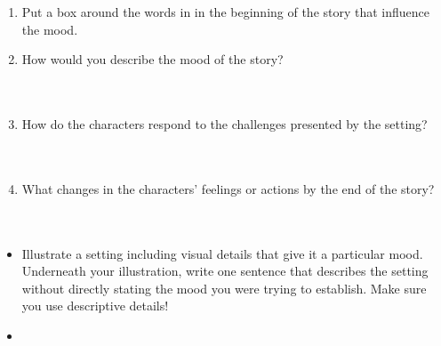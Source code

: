\documentclass[12pt]{article}
\begin{document}
\vspace{1em}

\begin{tcolorbox}[colframe=black!60, colback=white, 
coltitle=black, colbacktitle=black!15, fonttitle=\bfseries\Large, 
title=Independent Practice, halign title=center, left=10pt, right=10pt, top=10pt, bottom=15pt]

\begin{enumerate}[itemsep=1em]
    \item Put a box around the words in in the beginning of the story that influence the mood.

    \item How would you describe the mood of the story?
   \\[0.8cm] \underline{\hspace{14cm}}  
    \\[0.8cm] \underline{\hspace{14cm}}  
    \\[0.8cm] \underline{\hspace{14cm}} 
    \item How do the characters respond to the challenges presented by the setting?
\\[0.8cm] \underline{\hspace{14cm}}  
    \\[0.8cm] \underline{\hspace{14cm}}  
    \\[0.8cm] \underline{\hspace{14cm}} 
    \item What changes in the characters’ feelings or actions by the end of the story? 
    \\[0.8cm] \underline{\hspace{14cm}}  
    \\[0.8cm] \underline{\hspace{14cm}}  
    \\[0.8cm] \underline{\hspace{14cm}} 
\end{enumerate}
\end{tcolorbox}

\begin{tcolorbox}[colframe=black!60, colback=white, 
coltitle=black, colbacktitle=black!15, fonttitle=\bfseries\Large, 
title=Exit Ticket, halign title=center, left=10pt, right=10pt, top=10pt, bottom=15pt]
\begin{itemize}
    \item Illustrate a setting including visual details that give it a particular mood. Underneath your illustration, write one sentence that describes the setting without directly stating the mood you were trying to establish. Make sure you use descriptive details!
    \item \vspace{8cm}
\end{itemize}
\end{tcolorbox}
\end{document}
